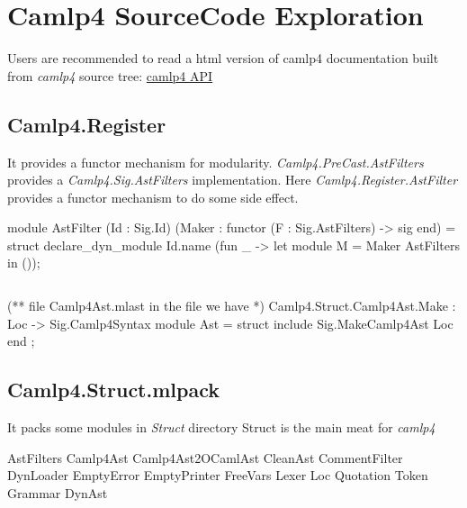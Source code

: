\section{Camlp4 SourceCode Exploration}
Users are recommended to read a html version of camlp4 documentation
built from \textit{camlp4} source tree:
\href{http://www.seas.upenn.edu/~hongboz/hongbo_zhang_files/camlp4/}{camlp4 API}











\subsection{Camlp4.Register}
It provides a functor mechanism for modularity.
\textit{Camlp4.PreCast.AstFilters} provides a
\textit{Camlp4.Sig.AstFilters} implementation. Here
\textit{Camlp4.Register.AstFilter} provides a functor mechanism
to do some side effect.

\begin{ocamlcode}
module AstFilter
  (Id : Sig.Id) (Maker : functor (F : Sig.AstFilters) -> sig end) =
struct
  declare_dyn_module Id.name (fun _ -> let module M = Maker AstFilters in ());
\end{ocamlcode}

\inputminted[fontsize=\scriptsize,]{ocaml}{code/camlp4/source/AstFilters.ml}



\begin{ocamlcode}
(** file Camlp4Ast.mlast   in the file we have *)
Camlp4.Struct.Camlp4Ast.Make : Loc -> Sig.Camlp4Syntax
  module Ast = struct
     include Sig.MakeCamlp4Ast Loc 
  end ;
\end{ocamlcode}


\subsection{Camlp4.Struct.mlpack}
\label{Camlp4.Struct}
It packs some modules in \textit{Struct} directory
Struct is the main meat for \textit{camlp4}

\begin{bashcode}
AstFilters
Camlp4Ast
Camlp4Ast2OCamlAst
CleanAst
CommentFilter
DynLoader
EmptyError
EmptyPrinter
FreeVars
Lexer
Loc
Quotation
Token
Grammar
DynAst
\end{bashcode}


